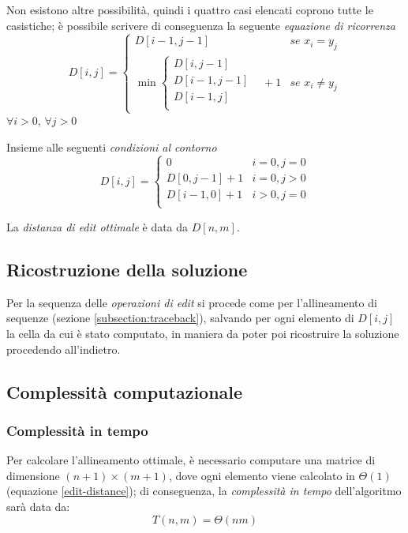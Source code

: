     Non esistono altre possibilità, quindi i quattro casi elencati coprono tutte le casistiche; è possibile scrivere di conseguenza la seguente \emph{equazione di ricorrenza}
    \begin{equation}
        D[i, j] = \begin{cases}
            D[i-1, j-1] & se \, \, x_i = y_j \\
            \min \begin{cases}
                D[i, j-1] & \\
                D[i-1, j-1] & \\
                D[i-1, j] & \\
            \end{cases} + 1 & se \, \, x_i \neq y_j 
        \end{cases}
        \label{edit-distance}
    \end{equation}
\centering
    $\forall i > 0, \, \forall j > 0$
    
\raggedright
    Insieme alle seguenti \emph{condizioni al contorno}
    \begin{equation}
        D[i, j] = \begin{cases}
            0 & i = 0, j = 0 \\
            D[0, j-1] + 1 & i = 0, j > 0 \\
            D[i-1, 0] + 1 & i > 0, j = 0 \\
        \end{cases}
    \label{edit-distance-base-case}
    \end{equation}

    La \emph{distanza di edit ottimale} è data da $D[n, m]$.

\subsection{Ricostruzione della soluzione}
    Per la sequenza delle \emph{operazioni di edit} si procede come per l'allineamento di sequenze (sezione \ref{subsection:traceback}), salvando per ogni elemento di $D[i, j]$ la cella da cui è stato computato, in maniera da poter poi ricostruire la soluzione procedendo all'indietro.
    
\raggedright
\subsection{Complessità computazionale}
\subsubsection{Complessità in tempo}
    Per calcolare l'allineamento ottimale, è necessario computare una matrice di dimensione $(n + 1) \times (m + 1)$, dove ogni elemento viene calcolato in $\Theta(1)$ (equazione \ref{edit-distance}); di conseguenza, la \emph{complessità in tempo} dell'algoritmo sarà data da:
    \begin{equation*}
        T(n, m) = \Theta(nm)
    \end{equation*}

